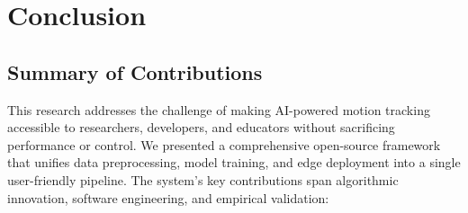 \chapter{Conclusion}
\label{chap:conclusion}

\section{Summary of Contributions}

This research addresses the challenge of making AI-powered motion tracking accessible to researchers, developers, and educators without sacrificing performance or control. We presented a comprehensive open-source framework that unifies data preprocessing, model training, and edge deployment into a single user-friendly pipeline. The system's key contributions span algorithmic innovation, software engineering, and empirical validation:

